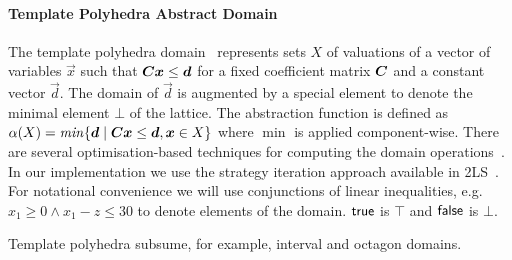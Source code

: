 \paragraph{Template Polyhedra Abstract Domain}
%
The template polyhedra domain~\cite{sriram} represents sets $X$ of
valuations of a vector of variables $\vec{x}$ such that
${\boldsymbol C}{\boldsymbol x}\leq{\boldsymbol d}$ for a fixed coefficient matrix ${\boldsymbol C}$
and a constant vector $\vec{d}$. The domain of $\vec{d}$ is augmented
by a special element to denote the minimal element $\bot$ of the lattice.
%
The abstraction function is defined as $\alpha(X) = \mathit{min} \{{\boldsymbol d}\mid
{\boldsymbol C}{\boldsymbol x}\leq{\boldsymbol d}, {\boldsymbol x}\in X\}$ where $\min$ is
applied component-wise. There are several optimisation-based
techniques for computing the domain
operations~\cite{sriram,GS07b,BJKS15}. In our implementation we use
the strategy iteration approach available in 2LS~\cite{BJKS15}.
%
For notational convenience we will use conjunctions of linear
inequalities, e.g.\ $x_1\geq 0 \wedge x_1-z\leq 30$ to denote elements
of the domain. $\mathsf{true}$ is $\top$ and $\mathsf{false}$ is $\bot$.

Template polyhedra subsume, for example, interval and octagon domains.

